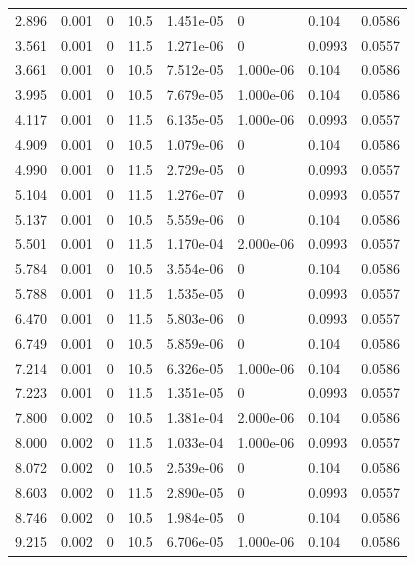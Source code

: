 \documentclass[preview]{standalone}
\begin{document}
{{\begin{tabular}{L{1.2cm}C{1.2cm} C{0.3cm}C{0.5cm} C{1.4cm}C{1.4cm} C{1.4cm}C{1.4cm}}
  2.896  &  0.001  & 0     & 10.5 &  1.451e-05  & 0  & 0.104 &  0.0586   \\ 
  3.561  &  0.001  & 0     & 11.5 &  1.271e-06  & 0  & 0.0993 &  0.0557   \\ 
  3.661  &  0.001  & 0     & 10.5 &  7.512e-05  & 1.000e-06  & 0.104 &  0.0586   \\ 
  3.995  &  0.001  & 0     & 10.5 &  7.679e-05  & 1.000e-06  & 0.104 &  0.0586   \\ 
  4.117  &  0.001  & 0     & 11.5 &  6.135e-05  & 1.000e-06  & 0.0993 &  0.0557   \\ 
  4.909  &  0.001  & 0     & 10.5 &  1.079e-06  & 0  & 0.104 &  0.0586   \\ 
  4.990  &  0.001  & 0     & 11.5 &  2.729e-05  & 0  & 0.0993 &  0.0557   \\ 
  5.104  &  0.001  & 0     & 11.5 &  1.276e-07  & 0  & 0.0993 &  0.0557   \\ 
  5.137  &  0.001  & 0     & 10.5 &  5.559e-06  & 0  & 0.104 &  0.0586   \\ 
  5.501  &  0.001  & 0     & 11.5 &  1.170e-04  & 2.000e-06  & 0.0993 &  0.0557   \\ 
  5.784  &  0.001  & 0     & 10.5 &  3.554e-06  & 0  & 0.104 &  0.0586   \\ 
  5.788  &  0.001  & 0     & 11.5 &  1.535e-05  & 0  & 0.0993 &  0.0557   \\ 
  6.470  &  0.001  & 0     & 11.5 &  5.803e-06  & 0  & 0.0993 &  0.0557   \\ 
  6.749  &  0.001  & 0     & 10.5 &  5.859e-06  & 0  & 0.104 &  0.0586   \\ 
  7.214  &  0.001  & 0     & 10.5 &  6.326e-05  & 1.000e-06  & 0.104 &  0.0586   \\ 
  7.223  &  0.001  & 0     & 11.5 &  1.351e-05  & 0  & 0.0993 &  0.0557   \\ 
  7.800  &  0.002  & 0     & 10.5 &  1.381e-04  & 2.000e-06  & 0.104 &  0.0586   \\ 
  8.000  &  0.002  & 0     & 11.5 &  1.033e-04  & 1.000e-06  & 0.0993 &  0.0557   \\ 
  8.072  &  0.002  & 0     & 10.5 &  2.539e-06  & 0  & 0.104 &  0.0586   \\ 
  8.603  &  0.002  & 0     & 11.5 &  2.890e-05  & 0  & 0.0993 &  0.0557   \\ 
  8.746  &  0.002  & 0     & 10.5 &  1.984e-05  & 0  & 0.104 &  0.0586   \\ 
  9.215  &  0.002  & 0     & 10.5 &  6.706e-05  & 1.000e-06  & 0.104 &  0.0586   \\ 

\end{tabular}}}
\end{document}
